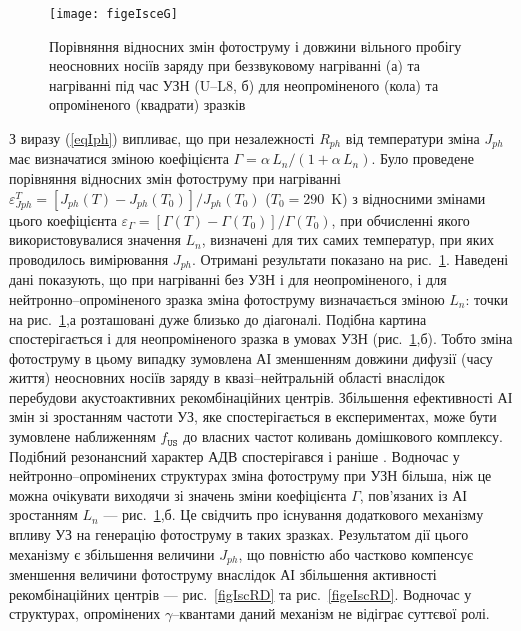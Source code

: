 \begin{figure}
\center
\texttt{[image: figeIsceG]}
\caption{\label{figeIsceG}
Порівняння відносних змін фотоструму і довжини
вільного пробігу неосновних носіїв заряду при беззвуковому
нагріванні (а) та нагріванні під час УЗН (U--L8, б)
для неопроміненого (кола) та опроміненого (квадрати) зразків
}%
\end{figure}

З виразу (\ref{eqIph}) випливає, що при незалежності $R_{ph}$ від температури
зміна $J_{ph}$ має визначатися зміною
коефіцієнта $\Gamma=\alpha\,L_n/(1+\alpha\,L_n)$.
Було проведене порівняння відносних змін
фотоструму при нагріванні $\varepsilon^T_{Jph}=[J_{ph}(T)-J_{ph}(T_0)]/J_{ph}(T_0)$
($T_0=290$~K)
з відносними змінами цього коефіцієнта $\varepsilon_\Gamma=[\Gamma(T)-\Gamma(T_0)]/\Gamma(T_0)$,
при обчисленні якого використовувалися значення  $L_n$, визначені
для тих самих температур, при яких проводилось вимірювання $J_{ph}$.
Отримані результати показано на рис.~\ref{figeIsceG}.
Наведені дані показують, що при нагріванні без УЗН і для неопроміненого,
і для нейтронно--опроміненого зразка зміна фотоструму визначається зміною
$L_n$:
точки на рис.~\ref{figeIsceG},а розташовані дуже близько до діагоналі.
Подібна картина спостерігається і для неопроміненого зразка в
умовах УЗН (рис.~\ref{figeIsceG},б).
Тобто зміна фотоструму в цьому випадку зумовлена АІ зменшенням
довжини дифузії (часу життя) неосновних носіїв заряду в квазі--нейтральній
області внаслідок перебудови акустоактивних рекомбінаційних центрів.
Збільшення ефективності АІ змін зі зростанням частоти УЗ, яке
спостерігається в експериментах, може бути зумовлене наближенням
$f_\mathtt{US}$ до власних частот коливань домішкового комплексу.
Подібний резонансний характер АДВ спостерігався і раніше \cite{Ol_Shav}.
Водночас у нейтронно--опромінених структурах зміна фотоструму при УЗН більша,
ніж це можна очікувати виходячи зі значень зміни коефіцієнта $\Gamma$, пов’язаних із АІ зростанням $L_n$ --- рис.~\ref{figeIsceG},б.
Це свідчить про існування додаткового механізму впливу УЗ на генерацію фотоструму в таких зразках.
Результатом дії цього механізму є збільшення величини $J_{ph}$, що повністю або частково компенсує
зменшення величини фотоструму внаслідок АІ збільшення активності рекомбінаційних центрів --- рис.~\ref{figIscRD} та рис.~\ref{figeIscRD}.
Водночас у структурах, опромінених $\gamma$--квантами даний механізм не відіграє суттєвої ролі.


